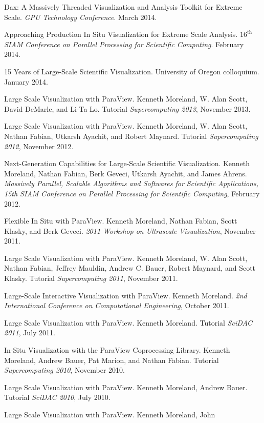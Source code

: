 \documentclass{article}
\begin{document}
\begin{enumerate}[label={[\arabic*]}]
\item Dax: A Massively Threaded Visualization and Analysis Toolkit for
  Extreme Scale. \emph{GPU Technology Conference}. March 2014.
\item Approaching Production In Situ Visualization for Extreme Scale
  Analysis. \emph{$16^{\mathrm{th}}$ SIAM Conference on Parallel
  Processing for Scientific Computing}. February 2014.
\item 15 Years of Large-Scale Scientific Visualization. University of
  Oregon colloquium. January 2014.
\item Large Scale Visualization with ParaView. Kenneth Moreland, W.
  Alan Scott, David DeMarle, and Li-Ta Lo. Tutorial
  \emph{Supercomputing 2013}, November 2013.
\item Large Scale Visualization with ParaView. Kenneth Moreland,
  W. Alan Scott, Nathan Fabian, Utkarsh Ayachit, and Robert
  Maynard. Tutorial \emph{Supercomputing 2012}, November 2012.
\item Next-Generation Capabilities for Large-Scale Scientific
  Visualization. Kenneth Moreland, Nathan Fabian, Berk Geveci, Utkarsh
  Ayachit, and James Ahrens. \emph{Massively Parallel, Scalable
    Algorithms and Softwares for Scientific Applications, 15th SIAM
    Conference on Parallel Processing for Scientific Computing},
  February 2012.
\item Flexible In Situ with ParaView. Kenneth Moreland, Nathan Fabian,
  Scott Klasky, and Berk Geveci. \emph{2011 Workshop on Ultrascale
    Visualization}, November 2011.
\item Large Scale Visualization with ParaView. Kenneth Moreland,
  W. Alan Scott, Nathan Fabian, Jeffrey Mauldin, Andrew C. Bauer,
  Robert Maynard, and Scott Klasky. Tutorial \emph{Supercomputing
    2011}, November 2011.
\item Large-Scale Interactive Visualization with ParaView. Kenneth
  Moreland. \emph{2nd International Conference on Computational
    Engineering}, October 2011.
\item Large Scale Visualization with ParaView. Kenneth
  Moreland. Tutorial \emph{SciDAC 2011}, July 2011.
\item In-Situ Visualization with the ParaView Coprocessing Library.
  Kenneth Moreland, Andrew Bauer, Pat Marion, and Nathan
  Fabian. Tutorial \emph{Supercomputing 2010}, November 2010.
\item Large Scale Visualization with ParaView. Kenneth Moreland,
  Andrew Bauer. Tutorial \emph{SciDAC 2010}, July 2010.
\item Large Scale Visualization with ParaView. Kenneth Moreland, John

\end{enumerate}
\end{document}
